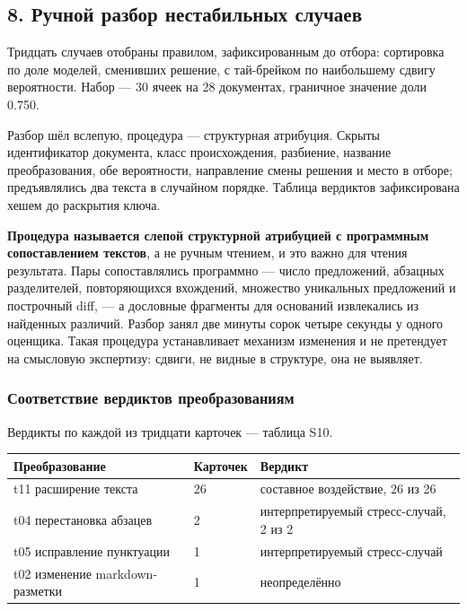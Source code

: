 \documentclass[11pt,a4paper]{article}
\renewcommand{\_}{\textunderscore\allowbreak}
\begin{document}
\subsection{8. Ручной разбор нестабильных случаев}

Тридцать случаев отобраны правилом, зафиксированным до отбора: сортировка по доле
моделей, сменивших решение, с тай-брейком по наибольшему сдвигу вероятности. Набор
— 30 ячеек на 28 документах, граничное значение доли 0.750.

Разбор шёл вслепую, процедура — структурная атрибуция. Скрыты идентификатор документа, класс происхождения,
разбиение, название преобразования, обе вероятности, направление смены решения и
место в отборе; предъявлялись два текста в случайном порядке. Таблица вердиктов
зафиксирована хешем до раскрытия ключа.

\textbf{Процедура называется слепой структурной атрибуцией с программным сопоставлением
текстов}, а не ручным чтением, и это важно для чтения результата. Пары
сопоставлялись программно — число предложений, абзацных разделителей,
повторяющихся вхождений, множество уникальных предложений и построчный diff, — а
дословные фрагменты для оснований извлекались из найденных различий. Разбор занял
две минуты сорок четыре секунды у одного оценщика. Такая процедура устанавливает
механизм изменения и не претендует на смысловую экспертизу: сдвиги, не видные в
структуре, она не выявляет.

\subsubsection{Соответствие вердиктов преобразованиям}

Вердикты по каждой из тридцати карточек — таблица S10.

\begin{center}
\small
\begin{tabular}{lll}
\toprule
Преобразование & Карточек & Вердикт \\
\midrule
t11 расширение текста & 26 & составное воздействие, 26 из 26 \\
t04 перестановка абзацев & 2 & интерпретируемый стресс-случай, 2 из 2 \\
t05 исправление пунктуации & 1 & интерпретируемый стресс-случай \\
t02 изменение markdown-разметки & 1 & неопределённо \\
\bottomrule
\end{tabular}
\end{center}
\end{document}
